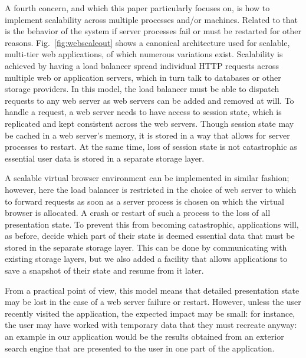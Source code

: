 A fourth concern, and which this paper particularly focuses on, is how to implement
scalability across multiple processes and/or machines. Related to that is the 
behavior of the system if server processes fail or must be restarted for other reasons.
Fig.~\ref{fig:webscaleout} shows a canonical architecture used for scalable, multi-tier web 
applications, of which numerous variations exist.  Scalability is achieved
by having a load balancer spread individual HTTP requests across multiple
web or application servers, which in turn talk to databases or other storage
providers.  In this model, the load balancer must be able to dispatch requests 
to any web server as web servers can be added and removed at will. To handle a 
request, a web server needs to have access to session state, which is replicated
and kept consistent across the web servers.  Though session state may be cached
in a web server's memory, it is stored in a way that allows for server processes
to restart.  At the same time, loss of session state is not catastrophic
as essential user data is stored in a separate storage layer.

A scalable virtual browser environment can be implemented in similar fashion;
however, here the load balancer is restricted in the choice of web server to 
which to forward requests as soon as a server process is chosen on which the
virtual browser is allocated.  A crash or restart of such a process 
to the loss of all presentation state.  To prevent this from becoming 
catastrophic, applications will, as before, decide which part of their
state is deemed essential data that must be stored in the separate storage
layer.  This can be done by communicating with existing storage layers,
but we also added a facility that allows applications to save a snapshot
of their state and resume from it later.

From a practical point of view, this model means that detailed presentation
state may be lost in the case of a web server failure or restart.
However, unless the user recently visited the application, the expected 
impact may be small: for instance, the user may have worked with temporary 
data that they must recreate anyway: an example in our application would be
the results obtained from an exterior search engine that are presented 
to the user in one part of the application.

